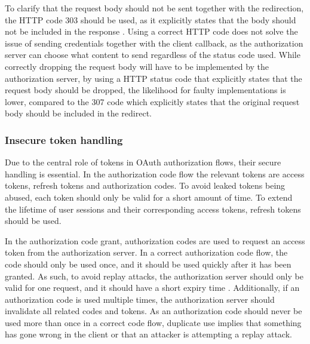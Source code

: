 To clarify that the request body should not be sent together with the redirection, the HTTP code 303 should be used, as it explicitly states that the body should not be included in the response \citep{fielding_http_2022}.
Using a correct HTTP code does not solve the issue of sending credentials together with the client callback, as the authorization server can choose what content to send regardless of the status code used.
While correctly dropping the request body will have to be implemented by the authorization server, by using a HTTP status code that explicitly states that the request body should be dropped, the likelihood for faulty implementations is lower, compared to the 307 code which explicitly states that the original request body should be included in the redirect.

\subsubsection{Insecure token handling}
Due to the central role of tokens in OAuth authorization flows, their secure handling is essential.
In the authorization code flow the relevant tokens are access tokens, refresh tokens and authorization codes.
To avoid leaked tokens being abused, each token should only be valid for a short amount of time.
To extend the lifetime of user sessions and their corresponding access tokens, refresh tokens should be used.

In the authorization code grant, authorization codes are used to request an access token from the authorization server.
In a correct authorization code flow, the code should only be used once, and it should be used quickly after it has been granted.
As such, to avoid replay attacks, the authorization server should only be valid for one request, and it should have a short expiry time \citep{yang_security_2013}.
Additionally, if an authorization code is used multiple times, the authorization server should invalidate all related codes and tokens.
As an authorization code should never be used more than once in a correct code flow, duplicate use implies that something has gone wrong in the client or that an attacker is attempting a replay attack.

